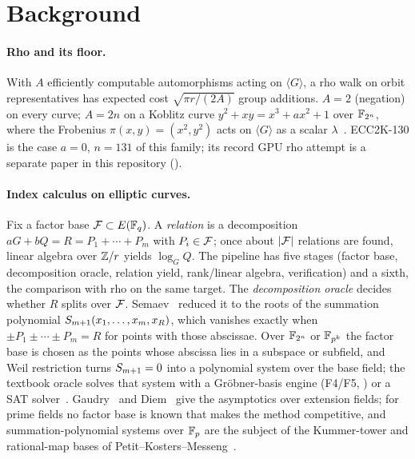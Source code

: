 \section{Background}\label{sec:background}

\paragraph{Rho and its floor.} With $A$ efficiently computable
automorphisms acting on $\langle G\rangle$, a rho walk on orbit
representatives has expected cost $\sqrt{\pi r/(2A)}$ group additions.
$A=2$ (negation) on every curve; $A=2n$ on a Koblitz curve
$y^2+xy=x^3+ax^2+1$ over $\mathbb{F}_{2^n}$, where the Frobenius
$\pi(x,y)=(x^2,y^2)$ acts on $\langle G\rangle$ as a scalar
$\lambda$~\cite{wiener1998,gallant2000}. ECC2K-130 is the case $a=0$,
$n=131$ of this family; its record GPU rho attempt is a separate paper in
this repository ().

\paragraph{Index calculus on elliptic curves.} Fix a factor base
$\mathcal{F}\subset E(\mathbb{F}_q)$. A \emph{relation} is a decomposition
$aG+bQ=R=P_1+\cdots+P_m$ with $P_i\in\mathcal{F}$; once about $\lvert \mathcal{F} \rvert$ relations
are found, linear algebra over $\mathbb{Z}/r$ yields $\log_G Q$. The pipeline has
five stages (factor base, decomposition oracle, relation yield, rank/linear
algebra, verification) and a sixth, the comparison with rho on the same
target. The \emph{decomposition oracle} decides whether $R$ splits over
$\mathcal{F}$. Semaev~\cite{semaev2004} reduced it to the roots of the summation
polynomial $S_{m+1}(x_1,\ldots,x_m,x_R)$, which vanishes exactly when
$\pm P_1\pm\cdots\pm P_m=R$ for points with those abscissae. Over
$\mathbb{F}_{2^n}$ or $\mathbb{F}_{p^k}$ the factor base is chosen as the points whose
abscissa lies in a subspace or subfield, and Weil restriction turns
$S_{m+1}=0$ into a polynomial system over the base field; the textbook
oracle solves that system with a Gr\"obner-basis engine (F4/F5,
\cite{faugere1999,faugere2002}) or a SAT solver~\cite{trimoska2020}.
Gaudry~\cite{gaudry2009} and Diem~\cite{diem2011} give the asymptotics
over extension fields; for prime fields no factor base is known that makes
the method competitive, and summation-polynomial systems over $\mathbb{F}_p$ are
the subject of the Kummer-tower and rational-map bases of
Petit--Kosters--Messeng~\cite{pkm2016}.

